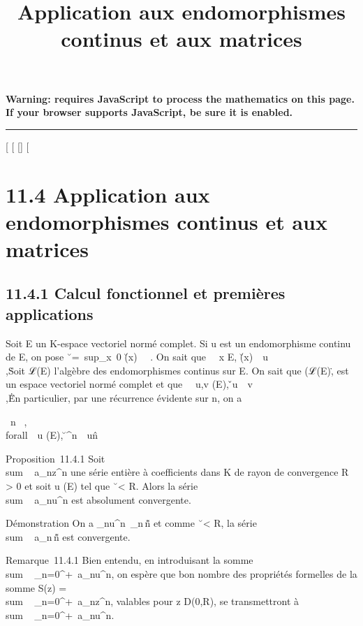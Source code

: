 \documentclass[]{article}
\title{Application aux endomorphismes continus et aux matrices}
\author{}
\date{}
\begin{document}
\maketitle

\textbf{Warning: 
requires JavaScript to process the mathematics on this page.\\ If your
browser supports JavaScript, be sure it is enabled.}

\begin{center}\rule{3in}{0.4pt}\end{center}

[
[
[]
[

\section{11.4 Application aux endomorphismes continus et aux
matrices}

\subsection{11.4.1 Calcul fonctionnel et premières applications}

Soit E un K-espace vectoriel normé complet. Si u est un endomorphisme
continu de E, on pose
\u\
=\
sup_x\neq~0
\u(x)\
\over
\x\ . On sait que
\forall~~x \in E,
\u(x)\
\leq\
u\\,\x\.
Soit ℒ(E) l'algèbre des endomorphismes continus sur E. On sait que
(ℒ(E),\.\) est un
espace vectoriel normé complet et que \forall~~u,v
\inℒ(E), \v \cdot u\
\leq\
v\\,\u\.
En particulier, par une récurrence évidente sur n, on a

\forall~n \in {}~, \\forall~~u (E),
\u^n\
\leq\ u\^n

Proposition~11.4.1 Soit
\\sum ~
a_nz^n une série entière à coefficients dans K de
rayon de convergence R > 0 et soit u (E) tel que
\u\ < R.
Alors la série \\sum ~
a_nu^n est absolument convergente.

Démonstration On a
\a_nu^n\
\leqa_n\,\u\^n
et comme \u\
< R, la série
\\sum ~
a_n\,\u\^n
est convergente.

Remarque~11.4.1 Bien entendu, en introduisant la somme
\\sum ~
_n=0^+\infty~a_nu^n, on espère que bon
nombre des propriétés formelles de la somme S(z)
= \\sum ~
_n=0^+\infty~a_nz^n, valables pour z \in
D(0,R), se transmettront à
\\sum ~
_n=0^+\infty~a_nu^n.
\end{document}
